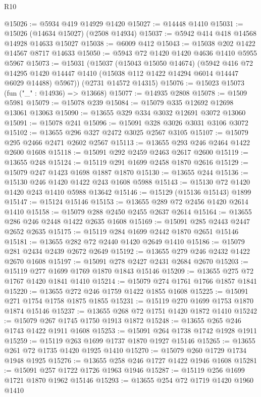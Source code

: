 \begin{lexlean}{R10}
\begin{coremodule}
@15026 := @5934 @419 @14929 @1420
@15027 := @14448 @1410
@15031 := @15026 (@14634 @15027) (@2508 @14934)
@15037 := @5942 @414 @418 @14568 @14928 @14633 @15027
@15038 := @6009 @412
@15043 := @15038 @202 @1422 @14567 @8717 @14633
@15050 := @5943 @72 @1420 @1420 @4636 @1410 @5955 @5967
@15073 := @15031
    (@15037
      (@15043 @15050 @14674)
      (@5942
        @416
        @72
        @14295
        @1420
        @14447
        @1410
        (@15038 @112 @1422 @14294 @6014 @14447 @6029 @14488)
        @5967))
    (@2731 @14572 @14315)
@15076 := @15023 @15073 (fun ("_" : @14936) => @13668)
@15077 := @14935 @2808
@15078 := @1509 @5981
@15079 := @15078 @239
@15084 := @15079 @335 @12692 @12698 @13061 @13063
@15090 := @13655 @329 @334 @3032 @12691 @3072 @13060
@15091 := @15078 @241
@15096 := @15091 @328 @3026 @3031 @3106 @3072
@15102 := @13655 @296 @327 @2472 @3025 @2567 @3105
@15107 := @15079 @295 @2466 @2471 @2602 @2567
@15113 := @13655 @293 @246 @2464 @1422 @2600 @1608
@15118 := @15091 @292 @2459 @2463 @2617 @2600
@15119 := @13655 @248
@15124 := @15119 @291 @1699 @2458 @1870 @2616
@15129 := @15079 @247 @1423 @1698 @1887 @1870
@15130 := @13655 @244
@15136 := @15130 @246 @1420 @1422 @243 @1608 @5988
@15143 := @15130 @72 @1420 @1420 @243 @1410 @5988 @13642
@15146 := @15129 (@15136 @15143) @1899
@15147 := @15124 @15146
@15153 := @13655 @289 @72 @2456 @1420 @2614 @1410
@15158 := @15079 @288 @2450 @2455 @2637 @2614
@15164 := @13655 @286 @246 @2448 @1422 @2635 @1608
@15169 := @15091 @285 @2443 @2447 @2652 @2635
@15175 := @15119 @284 @1699 @2442 @1870 @2651 @15146
@15181 := @13655 @282 @72 @2440 @1420 @2649 @1410
@15186 := @15079 @281 @2434 @2439 @2672 @2649
@15192 := @13655 @279 @246 @2432 @1422 @2670 @1608
@15197 := @15091 @278 @2427 @2431 @2684 @2670
@15203 := @15119 @277 @1699 @1769 @1870 @1843 @15146
@15209 := @13655 @275 @72 @1767 @1420 @1841 @1410
@15214 := @15079 @274 @1761 @1766 @1857 @1841
@15220 := @13655 @272 @246 @1759 @1422 @1855 @1608
@15225 := @15091 @271 @1754 @1758 @1875 @1855
@15231 := @15119 @270 @1699 @1753 @1870 @1874 @15146
@15237 := @13655 @268 @72 @1751 @1420 @1872 @1410
@15242 := @15079 @267 @1745 @1750 @1913 @1872
@15248 := @13655 @265 @246 @1743 @1422 @1911 @1608
@15253 := @15091 @264 @1738 @1742 @1928 @1911
@15259 := @15119 @263 @1699 @1737 @1870 @1927 @15146
@15265 := @13655 @261 @72 @1735 @1420 @1925 @1410
@15270 := @15079 @260 @1729 @1734 @1948 @1925
@15276 := @13655 @258 @246 @1727 @1422 @1946 @1608
@15281 := @15091 @257 @1722 @1726 @1963 @1946
@15287 := @15119 @256 @1699 @1721 @1870 @1962 @15146
@15293 := @13655 @254 @72 @1719 @1420 @1960 @1410

\end{coremodule}
\end{lexlean}
